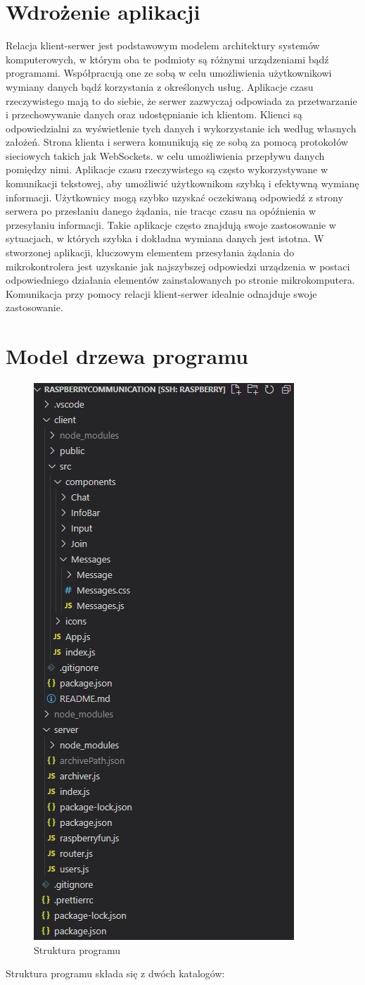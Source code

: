 \section{Wdrożenie aplikacji}
Relacja klient-serwer jest podstawowym modelem architektury systemów komputerowych, w którym oba te podmioty są różnymi urządzeniami bądź programami. Współpracują one ze sobą w celu umożliwienia użytkownikowi wymiany danych bądź korzystania z określonych usług. Aplikacje czasu rzeczywistego mają to do siebie, że serwer zazwyczaj odpowiada za przetwarzanie i przechowywanie danych oraz udostępnianie ich klientom. Klienci są odpowiedzialni za wyświetlenie tych danych i wykorzystanie ich według własnych założeń. Strona klienta i serwera komunikują się ze sobą za pomocą protokołów sieciowych takich jak WebSockets. w celu umożliwienia przepływu danych pomiędzy nimi. Aplikacje czasu rzeczywistego są często wykorzystywane w komunikacji tekstowej, aby umożliwić użytkownikom szybką i efektywną wymianę informacji. Użytkownicy mogą szybko uzyskać oczekiwaną odpowiedź z strony serwera po przesłaniu danego żądania, nie tracąc czasu na opóźnienia w przesyłaniu informacji. Takie aplikacje często znajdują swoje zastosowanie w sytuacjach, w których szybka i dokładna wymiana danych jest istotna. W stworzonej aplikacji, kluczowym elementem przesyłania żądania do mikrokontrolera jest uzyskanie jak najszybszej odpowiedzi urządzenia w postaci odpowiedniego działania elementów zainstalowanych po stronie mikrokomputera. Komunikacja przy pomocy relacji klient-serwer idealnie odnajduje swoje zastosowanie.
\section{Model drzewa programu}
\begin{figure}
	\centering
	\includegraphics[width=0.5\linewidth]{"obrazy/model"}
	\caption{Struktura programu}
	\label{fig:6}
\end{figure}
Struktura programu składa się z dwóch katalogów: 

